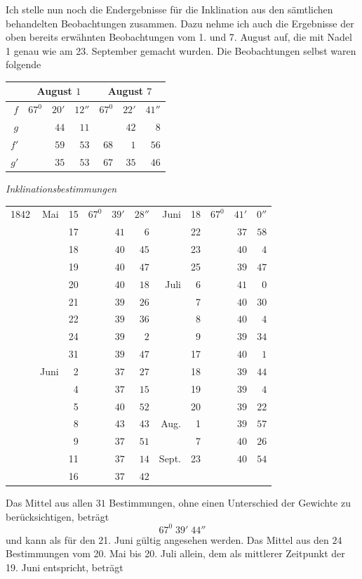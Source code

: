 Ich stelle nun noch die Endergebnisse für die Inklination aus den sämtli\-chen behandelten Beobachtungen zusammen. Dazu nehme ich auch die Ergebnisse der oben bereits erwähnten Beobachtungen vom 1. und 7. August auf, die mit Nadel 1 genau wie am 23. September gemacht wurden. Die Beobachtungen selbst waren folgende
\begin{center}
\begin{tabular}{r||rrr||rrr}
&\multicolumn{3}{c||}{August $1$}&\multicolumn{3}{c}{August $7$}\\\hline
$f$&$67^0$&$20'$&$12''$&$67^0$&$22'$&$41''$\\
$g$&&$44$&$11$&&$42$&$8$\\
$f'$&&$59$&$53$&$68$&$1$&$56$\\
$g'$&&$35$&$53$&$67$&$35$&$46$
\end{tabular}
\end{center}
\begin{center}\textit{Inklinationsbestimmungen}

\begin{tabular}{rrr|rrr||rr|rrr}
1842&Mai&15&$67^0$&$39'$&$28''$&Juni&18&$67^0$&$41'$&$0''$\\
&&17&&$41$&$6$&&22&&$37$&$58$\\
&&18&&$40$&$45$&&23&&$40$&$4$\\
&&19&&$40$&$47$&&25&&$39$&$47$\\
&&20&&$40$&$18$&Juli&6&&$41$&$0$\\
&&21&&$39$&$26$&&7&&$40$&$30$\\
&&22&&$39$&$36$&&8&&$40$&$4$\\
&&24&&$39$&$2$&&9&&$39$&$34$\\
&&31&&$39$&$47$&&17&&$40$&$1$\\
&Juni&2&&$37$&$27$&&18&&$39$&$44$\\
&&4&&$37$&$15$&&19&&$39$&$4$\\
&&5&&$40$&$52$&&20&&$39$&$22$\\
&&8&&$43$&$43$&Aug.&1&&$39$&$57$\\
&&9&&$37$&$51$&&7&&$40$&$26$\\
&&11&&$37$&$14$&Sept.&23&&$40$&$54$\\
&&16&&$37$&$42$&&&&&
\end{tabular}
\end{center}
Das Mittel aus allen $31$ Bestimmungen, ohne einen Unterschied der Gewichte zu berücksichtigen, beträgt
\[
67^0\;39'\;44''
\]
und kann als für den 21. Juni gültig angesehen werden. Das Mittel aus den $24$ Bestimmungen vom 20. Mai bis 20. Juli allein, dem als mittlerer Zeitpunkt der 19. Juni entspricht, beträgt
